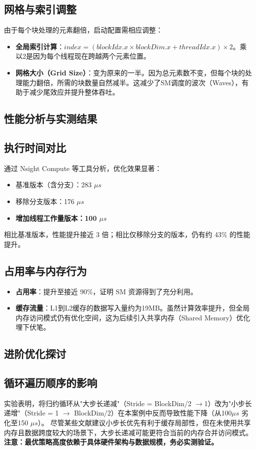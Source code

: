 \subsection{网格与索引调整}
由于每个块处理的元素翻倍，启动配置需相应调整：
\begin{itemize}
    \item \textbf{全局索引计算}：$index = (blockIdx.x \times blockDim.x + threadIdx.x) \times 2$。乘以2是因为每个线程现在跨越两个元素位置。
    \item \textbf{网格大小（Grid Size）}：变为原来的一半。因为总元素数不变，但每个块的处理能力翻倍，所需的块数量自然减半。这减少了SM调度的波次（Waves），有助于减少尾效应并提升整体吞吐。
\end{itemize}

\subsection{性能分析与实测结果}
\subsection{执行时间对比}
通过 Nsight Compute 等工具分析，优化效果显著：
\begin{itemize}
    \item 基准版本（含分支）：283 $\mu s$
    \item 移除分支版本：176 $\mu s$
    \item \textbf{增加线程工作量版本：100 $\mu s$}
\end{itemize}
相比基准版本，性能提升接近 3 倍；相比仅移除分支的版本，仍有约 43\% 的性能提升。

\subsection{占用率与内存行为}
\begin{itemize}
    \item \textbf{占用率}：提升至接近 90\%，证明 SM 资源得到了充分利用。
    \item \textbf{缓存流量}：L1到L2缓存的数据写入量约为19MB。虽然计算效率提升，但全局内存访问模式仍有优化空间，这为后续引入共享内存（Shared Memory）优化埋下伏笔。
\end{itemize}

\subsection{进阶优化探讨}
\subsection{循环遍历顺序的影响}
实验表明，将归约循环从"大步长递减"（Stride = BlockDim/2 $\to$1）改为"小步长递增"（Stride = 1 $\to$ BlockDim/2）在本案例中反而导致性能下降（从100$\mu s$ 劣化至150 $\mu s$）。
尽管某些文献建议小步长优先有利于缓存局部性，但在未使用共享内存且数据跨度较大的场景下，大步长递减可能更符合当前的内存合并访问模式。\textbf{注意：最优策略高度依赖于具体硬件架构与数据规模，务必实测验证。}

